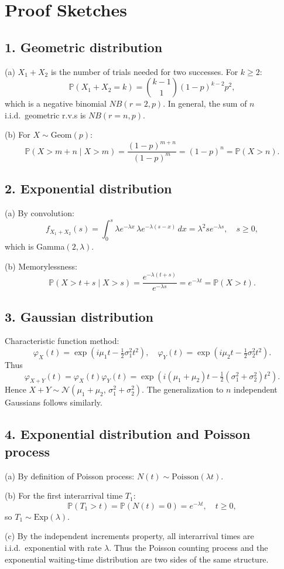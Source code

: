 \documentclass[11pt]{article}
\newcommand{\Pbb}{\mathbb{P}}
\newcommand{\1}{\mathbf{1}}
\begin{document}
\newpage

\section*{Proof Sketches}

\subsection*{1. Geometric distribution}
(a) $X_1+X_2$ is the number of trials needed for two successes. For $k\geq 2$:
\[
  \Pbb(X_1+X_2=k) = \binom{k-1}{1} (1-p)^{k-2}p^2,
\]
which is a negative binomial $NB(r=2,p)$. In general, the sum of $n$ i.i.d.\ geometric r.v.s is $NB(r=n,p)$.  

(b) For $X\sim\mathrm{Geom}(p)$:
\[
  \Pbb(X>m+n \mid X>m) = \frac{(1-p)^{m+n}}{(1-p)^m} = (1-p)^n = \Pbb(X>n).
\]

\subsection*{2. Exponential distribution}
(a) By convolution:
\[
  f_{X_1+X_2}(s) = \int_0^s \lambda e^{-\lambda x}\, \lambda e^{-\lambda(s-x)}\,dx = \lambda^2 s e^{-\lambda s}, \quad s\ge 0,
\]
which is Gamma$(2,\lambda)$.  

(b) Memorylessness:
\[
  \Pbb(X>t+s \mid X>s) = \frac{e^{-\lambda(t+s)}}{e^{-\lambda s}} = e^{-\lambda t} = \Pbb(X>t).
\]

\subsection*{3. Gaussian distribution}
Characteristic function method:  
\[
  \varphi_X(t)=\exp\!\left(i\mu_1 t - \tfrac{1}{2}\sigma_1^2 t^2\right),\quad
  \varphi_Y(t)=\exp\!\left(i\mu_2 t - \tfrac{1}{2}\sigma_2^2 t^2\right).
\]
Thus
\[
  \varphi_{X+Y}(t)=\varphi_X(t)\varphi_Y(t)=\exp\!\left(i(\mu_1+\mu_2)t - \tfrac{1}{2}(\sigma_1^2+\sigma_2^2)t^2\right).
\]
Hence $X+Y\sim \mathcal{N}(\mu_1+\mu_2,\,\sigma_1^2+\sigma_2^2)$.  
The generalization to $n$ independent Gaussians follows similarly.

\subsection*{4. Exponential distribution and Poisson process}
(a) By definition of Poisson process: $N(t)\sim \mathrm{Poisson}(\lambda t)$.  

(b) For the first interarrival time $T_1$:
\[
  \Pbb(T_1>t)=\Pbb(N(t)=0)=e^{-\lambda t},\quad t\ge 0,
\]
so $T_1\sim \mathrm{Exp}(\lambda)$.  

(c) By the independent increments property, all interarrival times are i.i.d.\ exponential with rate $\lambda$. Thus the Poisson counting process and the exponential waiting-time distribution are two sides of the same structure.
\end{document}
